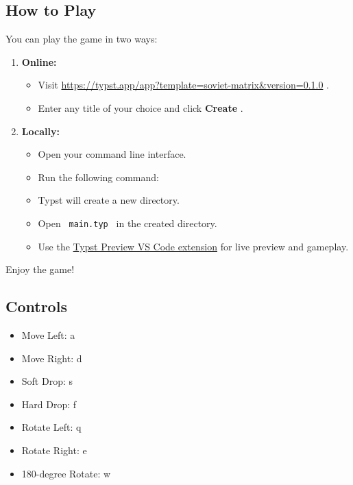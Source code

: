 \subsection{How to Play}\label{how-to-play}

You can play the game in two ways:

\begin{enumerate}
\item
  \textbf{Online:}

  \begin{itemize}
  \tightlist
  \item
    Visit
    \url{https://typst.app/app?template=soviet-matrix&version=0.1.0} .
  \item
    Enter any title of your choice and click \textbf{Create} .
  \end{itemize}
\item
  \textbf{Locally:}

  \begin{itemize}
  \item
    Open your command line interface.
  \item
    Run the following command:

\begin{Shaded}
\begin{Highlighting}[]
\end{Highlighting}
\end{Shaded}
  \item
    Typst will create a new directory.
  \item
    Open \texttt{\ main.typ\ } in the created directory.
  \item
    Use the
    \href{https://marketplace.visualstudio.com/items?itemName=mgt19937.typst-preview}{Typst
    Preview VS Code extension} for live preview and gameplay.
  \end{itemize}
\end{enumerate}

Enjoy the game!

\subsection{Controls}\label{controls}

\begin{itemize}
\tightlist
\item
  Move Left: a
\item
  Move Right: d
\item
  Soft Drop: s
\item
  Hard Drop: f
\item
  Rotate Left: q
\item
  Rotate Right: e
\item
  180-degree Rotate: w
\end{itemize}

